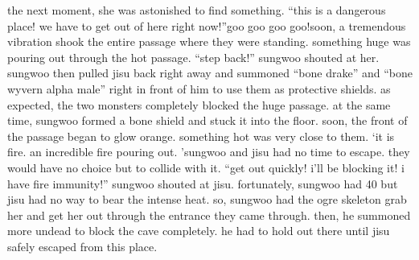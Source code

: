 the next moment, she was astonished to find something.
“this is a dangerous place! we have to get out of here right now!”goo goo goo goo!soon, a tremendous vibration shook the entire passage where they were standing.
something huge was pouring out through the hot passage.
“step back!” sungwoo shouted at her.
sungwoo then pulled jisu back right away and summoned “bone drake” and “bone wyvern alpha male” right in front of him to use them as protective shields.
 as expected, the two monsters completely blocked the huge passage.
 at the same time, sungwoo formed a bone shield and stuck it into the floor.
soon, the front of the passage began to glow orange.
 something hot was very close to them.
‘it is fire.
 an incredible fire pouring out.
’sungwoo and jisu had no time to escape.
 they would have no choice but to collide with it.
“get out quickly! i’ll be blocking it! i have fire immunity!” sungwoo shouted at jisu.
fortunately, sungwoo had 40%
but jisu had no way to bear the intense heat.
 so, sungwoo had the ogre skeleton grab her and get her out through the entrance they came through.
 then, he summoned more undead to block the cave completely.
 he had to hold out there until jisu safely escaped from this place.

